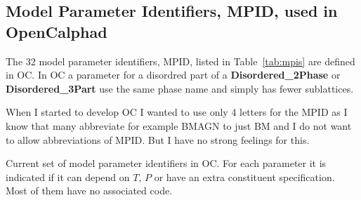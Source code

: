 \documentclass{article}
\begin{document}
\begin{appendices}
\newpage 

\setcounter{equation}{0}
\renewcommand{\theequation}{C\arabic{equation}}
\setcounter{figure}{0}
\renewcommand{\thefigure}{C\arabic{figure}}

\section{Model Parameter Identifiers, MPID, used in OpenCalphad}\label{sec:mpid2}

The 32 model parameter identifiers, MPID, listed in
Table~\ref{tab:mpis} are defined in OC.  In OC a parameter for a
disordred part of a {\bf Disordered\_2Phase} or {\bf
  Disordered\_3Part} use the same phase name and simply has fewer
sublattices.

When I started to develop OC I wanted to use only 4 letters for the
MPID as I know that many abbreviate for example BMAGN to just BM and I
do not want to allow abbreviations of MPID.  But I have no strong
feelings for this.

\begin{table}[!h]
  \caption{Current set of model parameter identifiers in OC.  For each
    parameter it is indicated if it can depend on $T$, $P$ or have an
    extra constituent specification.  Most of them have no associated
    code.}\label{tab:mpis}


\end{table}
\end{appendices}
\end{document}
